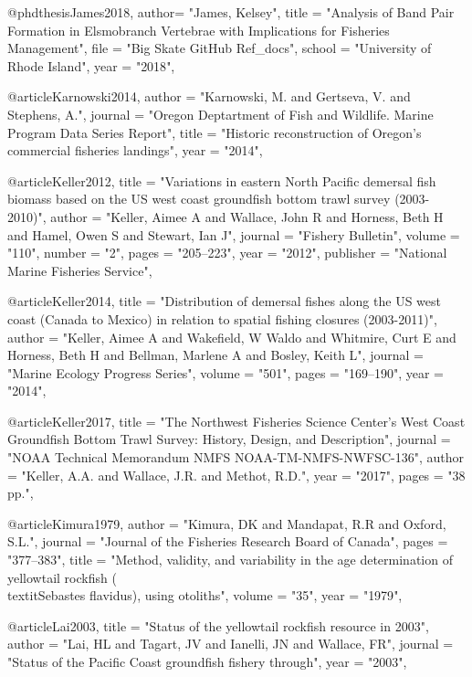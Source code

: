 @phdthesis{James2018,
    author= "{James, Kelsey}",
    title = "{Analysis of Band Pair Formation in Elsmobranch Vertebrae with Implications for Fisheries Management}",
    file = "{Big Skate GitHub Ref_docs}",
    school = "{University of Rhode Island}",
    year = "{2018}",
}

@article{Karnowski2014,
    author = "{Karnowski, M. and Gertseva, V. and Stephens, A.}",
    journal = "{Oregon Deptartment of Fish and Wildlife. Marine Program Data Series Report}",
    title = "{{Historic reconstruction of Oregon's commercial fisheries landings}}",
    year = "{2014}",
}

@article{Keller2012,
    title = "{Variations in eastern North Pacific demersal fish biomass based on the US west coast groundfish bottom trawl survey (2003-2010)}",
    author = "{Keller, Aimee A and Wallace, John R and Horness, Beth H and Hamel, Owen S and Stewart, Ian J}",
    journal = "{Fishery Bulletin}",
    volume = "{110}",
    number = "{2}",
    pages = "{205--223}",
    year = "{2012}",
    publisher = "{National Marine Fisheries Service}",
}

@article{Keller2014,
    title = "{Distribution of demersal fishes along the US west coast (Canada to Mexico) in relation to spatial fishing closures (2003-2011)}",
    author = "{Keller, Aimee A and Wakefield, W Waldo and Whitmire, Curt E and Horness, Beth H and Bellman, Marlene A and Bosley, Keith L}",
    journal = "{Marine Ecology Progress Series}",
    volume = "{501}",
    pages = "{169--190}",
    year = "{2014}",
}

@article{Keller2017,
    title = "{The Northwest Fisheries Science Center's West Coast Groundfish Bottom Trawl Survey: History, Design, and Description}",
    journal = "{NOAA Technical Memorandum NMFS NOAA-TM-NMFS-NWFSC-136}",
    author = "{Keller, A.A. and Wallace, J.R. and Methot, R.D.}",
    year = "{2017}",
    pages = "{38 pp.}",
}

@article{Kimura1979,
    author = "{Kimura, DK and Mandapat, R.R and Oxford, S.L.}",
    journal = "{Journal of the Fisheries Research Board of Canada}",
    pages = "{377--383}",
    title = "{{Method, validity, and variability in the age determination of yellowtail rockfish (\\textit{{Sebastes} flavidus}), using otoliths}}",
    volume = "{35}",
    year = "{1979}",
}

@article{Lai2003,
    title = "{Status of the yellowtail rockfish resource in 2003}",
    author = "{Lai, HL and Tagart, JV and Ianelli, JN and Wallace, FR}",
    journal = "{Status of the Pacific Coast groundfish fishery through}",
    year = "{2003}",
}

